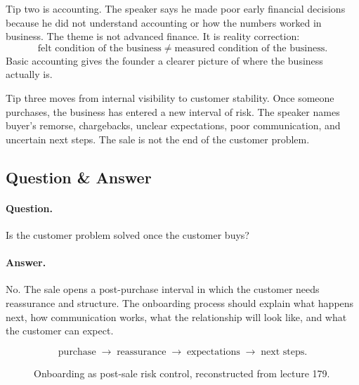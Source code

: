 \documentclass[11pt,oneside]{book}
\begin{document}
Tip two is accounting. The speaker says he made poor early financial decisions because he did not understand accounting or how the numbers worked in business. The theme is not advanced finance. It is reality correction:
\[
\text{felt condition of the business}
\neq
\text{measured condition of the business}.
\]
Basic accounting gives the founder a clearer picture of where the business actually is.

Tip three moves from internal visibility to customer stability. Once someone purchases, the business has entered a new interval of risk. The speaker names buyer's remorse, chargebacks, unclear expectations, poor communication, and uncertain next steps. The sale is not the end of the customer problem.

\subsection{Question \& Answer}

\paragraph{Question.}
Is the customer problem solved once the customer buys?

\paragraph{Answer.}
No. The sale opens a post-purchase interval in which the customer needs reassurance and structure. The onboarding process should explain what happens next, how communication works, what the relationship will look like, and what the customer can expect.

\[
\text{purchase}
\;\longrightarrow\;
\text{reassurance}
\;\longrightarrow\;
\text{expectations}
\;\longrightarrow\;
\text{next steps}.
\]

\begin{figure}
\centering
{}
\caption{Onboarding as post-sale risk control, reconstructed from lecture 179.}
\end{figure}
\end{document}
